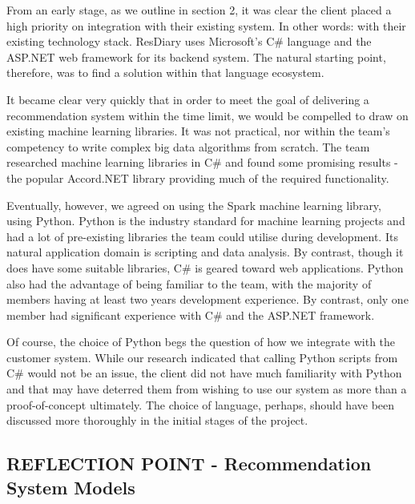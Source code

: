 \documentclass{l3proj}
\begin{document}
From an early stage, as we outline in section 2, it was clear the client placed a high priority on integration with their existing system. In other words: with their existing technology stack. ResDiary uses Microsoft's C\# language and the ASP.NET web framework for its backend system. The natural starting point, therefore, was to find a solution within that language ecosystem. 

It became clear very quickly that in order to meet the goal of delivering a recommendation system within the time limit, we would be compelled to draw on existing machine learning libraries. It was not practical, nor within the team’s competency to write complex big data algorithms from scratch. The team researched machine learning libraries in C\# and found some promising results - the popular Accord.NET library providing much of the required functionality. 

Eventually, however, we agreed on using the Spark machine learning library, using Python. Python is the industry standard for machine learning projects and had a lot of pre-existing libraries the team could utilise during development. Its natural application domain is scripting and data analysis. By contrast, though it does have some suitable libraries, C\# is geared toward web applications. Python also had the advantage of being familiar to the team, with the majority of members having at least two years development experience. By contrast, only one member had significant experience with C\# and the ASP.NET framework.

Of course, the choice of Python begs the question of how we integrate with the customer system. While our research indicated that calling Python scripts from C\# would not be an issue, the client did not have much familiarity with Python and that may have deterred them from wishing to use our system as more than a proof-of-concept ultimately. The choice of language, perhaps, should have been discussed more thoroughly in the initial stages of the project.


\subsection{REFLECTION POINT - Recommendation System Models}
\label{sec:modelreflection}
\end{document}
